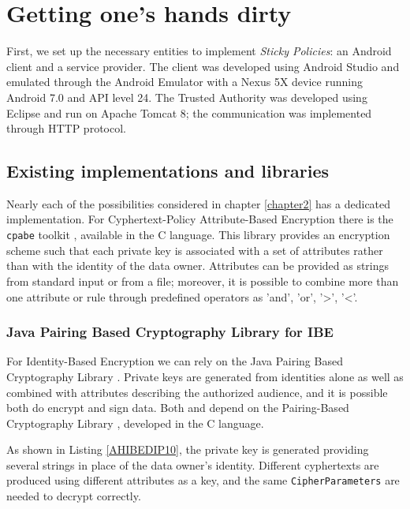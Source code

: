 \chapter{Getting one's hands dirty}
\label{chapter3}
\thispagestyle{empty}

\noindent First, we set up the necessary entities to implement \textit{Sticky Policies}: an Android client and a service provider. The client was developed using Android Studio and emulated through the Android Emulator with a Nexus 5X device running Android 7.0 and API level 24. The Trusted Authority was developed using Eclipse and run on Apache Tomcat 8; the communication was implemented through HTTP protocol.

\section{Existing implementations and libraries}
Nearly each of the possibilities considered in chapter \ref{chapter2} has a dedicated implementation. For Cyphertext-Policy Attribute-Based Encryption there is the \texttt{cpabe} toolkit \cite{bethencourt2011library}, available in the C language. This library provides an encryption scheme such that each private key is associated with a set of attributes rather than with the identity of the data owner. Attributes can be provided as strings from standard input or from a file; moreover, it is possible to combine more than one attribute or rule through predefined operators as 'and', 'or', '>', '<'.

\subsection{Java Pairing Based Cryptography Library for IBE}
For Identity-Based Encryption we can rely on the Java Pairing Based Cryptography Library \cite{ISCC:DecIov11}. Private keys are generated from identities alone as well as combined with attributes describing the authorized audience, and it is possible both do encrypt and sign data. Both \cite{ISCC:DecIov11} and \cite{bethencourt2011library} depend on the Pairing-Based Cryptography Library \cite{PBC2007Lynn}, developed in the C language.



As shown in Listing \ref{AHIBEDIP10}, the private key is generated providing several strings in place of the data owner's identity. Different cyphertexts are produced using different attributes as a key, and the same \texttt{CipherParameters} are needed to decrypt correctly.

